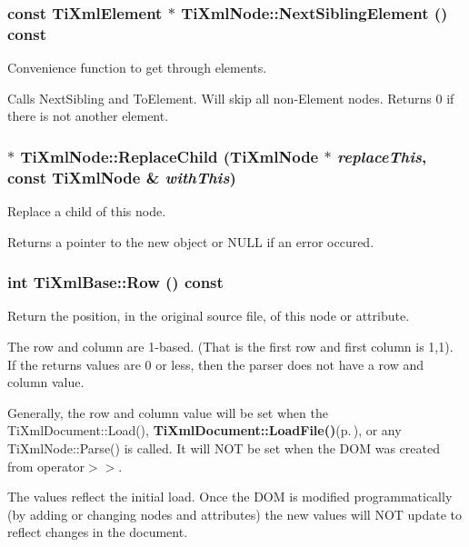 \subsubsection{\setlength{\rightskip}{0pt plus 5cm}const {\bf Ti\-Xml\-Element} $\ast$ Ti\-Xml\-Node::Next\-Sibling\-Element () const\hspace{0.3cm}{\tt  [inherited]}}\label{classTiXmlNode_TiXmlUnknowna50}


Convenience function to get through elements. 

Calls Next\-Sibling and To\-Element. Will skip all non-Element nodes. Returns 0 if there is not another element.
\subsubsection{ $\ast$ Ti\-Xml\-Node::Replace\-Child ({\bf Ti\-Xml\-Node} $\ast$ {\em replace\-This}, const {\bf Ti\-Xml\-Node} \& {\em with\-This})\hspace{0.3cm}{\tt  [inherited]}}\label{classTiXmlNode_TiXmlUnknowna36}


Replace a child of this node. 

Returns a pointer to the new object or NULL if an error occured.
\subsubsection{\setlength{\rightskip}{0pt plus 5cm}int Ti\-Xml\-Base::Row () const\hspace{0.3cm}{\tt  [inline, inherited]}}\label{classTiXmlBase_TiXmlUnknowna78}


Return the position, in the original source file, of this node or attribute. 

The row and column are 1-based. (That is the first row and first column is 1,1). If the returns values are 0 or less, then the parser does not have a row and column value.

Generally, the row and column value will be set when the Ti\-Xml\-Document::Load(), {\bf Ti\-Xml\-Document::Load\-File()}{\rm (p.\,\pageref{classTiXmlDocument_TiXmlDocumenta6})}, or any Ti\-Xml\-Node::Parse() is called. It will NOT be set when the DOM was created from operator$>$$>$.

The values reflect the initial load. Once the DOM is modified programmatically (by adding or changing nodes and attributes) the new values will NOT update to reflect changes in the document.

